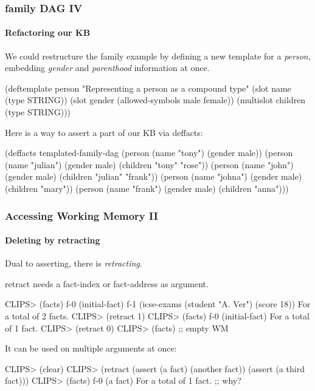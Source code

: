 \documentclass[xcolor={usenames,dvipsnames,svgnames}, compress]{beamer}
\begin{document}
\begin{frame}[fragile]
  \frametitle{family DAG IV}
  \framesubtitle{Refactoring our KB}
  We could restructure the family example by defining a new template
  for a \emph{person}, embedding \emph{gender} and \emph{parenthood}
  information at once.
  \begin{clips-code}[numbers=none]
    (deftemplate person
        "Representing a person as a compound type"
        (slot name
            (type STRING))
        (slot gender
            (allowed-symbols male female))
        (multislot children
            (type STRING)))
  \end{clips-code}
  
  Here is a way to assert a part of our KB via \textsf{deffacts}:
  \begin{clips-code}[numbers=none]
    (deffacts templated-family-dag
        (person (name "tony") (gender male))
        (person (name "julian") (gender male) (children "tony" "rose"))
        (person (name "john") (gender male) (children "julian" "frank"))
        (person (name "johna") (gender male) (children "mary"))
        (person (name "frank") (gender male) (children "anna")))
      \end{clips-code}
      
\end{frame}

\begin{frame}[fragile]
  \frametitle{Accessing Working Memory II}
  \framesubtitle{Deleting by retracting}
  Dual to asserting, there is \emph{retracting}.\par
  \textsf{retract} needs a fact-index or fact-address as argument.
  \begin{clips-code}
    CLIPS> (facts)
    f-0     (initial-fact)
    f-1     (icse-exams (student "A. Ver") (score 18))
    For a total of 2 facts.
    CLIPS> (retract 1)
    CLIPS> (facts)
    f-0     (initial-fact)
    For a total of 1 fact.
    CLIPS> (retract 0)
    CLIPS> (facts) ;; empty WM
  \end{clips-code}
  It can be used on multiple arguments at once:
  \begin{clips-code}
    CLIPS> (clear)
    CLIPS> (retract (assert (a fact) (another fact)) (assert (a third fact)))
    CLIPS> (facts)
    f-0     (a fact)
    For a total of 1 fact. ;; why?
  \end{clips-code}
\end{frame}
\end{document}
